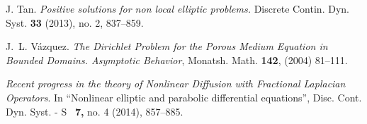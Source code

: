 \documentclass[11pt]{article}
\numberwithin{equation}{section}
\begin{document}
\begin{thebibliography}{00}
 J. Tan. \textit{Positive solutions for non local elliptic problems. }Discrete Contin. Dyn. Syst. \textbf{33} (2013), no. 2, 837--859.


  J.~L. V{\'a}zquez.  \textit{The Dirichlet Problem for the Porous Medium Equation in Bounded Domains. Asymptotic Behavior}, Monatsh. Math. \textbf{142}, (2004) 81--111.


 \textit{ Recent progress in the theory  of Nonlinear Diffusion with  Fractional Laplacian Operators}. In ``Nonlinear elliptic and parabolic differential equations'', Disc. Cont. Dyn. Syst. - S \ {\bf 7,} no. 4 (2014), 857--885.



\end{thebibliography}
\end{document}

